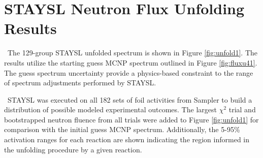 \section{STAYSL Neutron Flux Unfolding Results}

\ The 129-group STAYSL unfolded spectrum is shown in Figure \ref{fig:unfold1}.
The results utilize the starting guess MCNP spectrum outlined in Figure \ref{fig:fluxu41}.
The guess spectrum uncertainty provide a physics-based constraint to the range of spectrum adjustments performed by STAYSL. 

\ STAYSL was executed on all 182 sets of foil activities from Sampler to build a distribution of possible modeled experimental outcomes. 
The largest $\chi^{2}$ trial and bootstrapped neutron fluence from all trials were added to Figure \ref{fig:unfold1} for comparison with the initial guess MCNP spectrum.
Additionally, the 5-95\% activation ranges for each reaction are shown indicating the region  informed in the unfolding procedure by a given reaction.  


